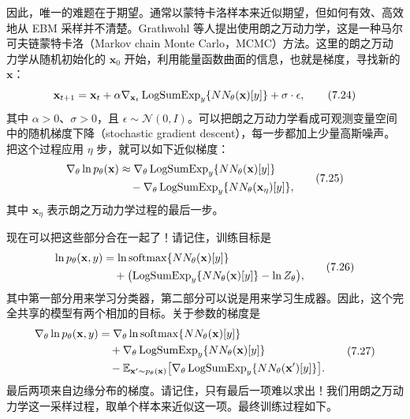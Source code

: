 因此，唯一的难题在于期望。通常以蒙特卡洛样本来近似期望，但如何有效、高效地从 EBM 采样并不清楚。Grathwohl 等人提出使用朗之万动力学，这是一种马尔可夫链蒙特卡洛（Markov chain Monte Carlo，MCMC）方法。这里的朗之万动力学从随机初始化的 $\mathbf{x}_0$ 开始，利用能量函数曲面的信息，也就是梯度，寻找新的 $\mathbf{x}$：
\begin{equation}
\mathbf{x}_{t+1}=\mathbf{x}_t+\alpha\nabla_{\mathbf{x}_t}
  \operatorname{LogSumExp}_y\{NN_\theta(\mathbf{x})[y]\}+\sigma\cdot\epsilon,
\tag{7.24}\label{eq:07-24}
\end{equation}
其中 $\alpha>0$、$\sigma>0$，且 $\epsilon\sim\mathcal{N}(0,I)$。可以把朗之万动力学看成可观测变量空间中的随机梯度下降（stochastic gradient descent），每一步都加上少量高斯噪声。把这个过程应用 $\eta$ 步，就可以如下近似梯度：
\begin{equation}
\begin{aligned}
\nabla_\theta\ln p_\theta(\mathbf{x})
 &\approx\nabla_\theta\operatorname{LogSumExp}_y\{NN_\theta(\mathbf{x})[y]\}\\
 &\quad-\nabla_\theta\operatorname{LogSumExp}_y\{NN_\theta(\mathbf{x}_\eta)[y]\},
\end{aligned}
\tag{7.25}\label{eq:07-25}
\end{equation}
其中 $\mathbf{x}_\eta$ 表示朗之万动力学过程的最后一步。

现在可以把这些部分合在一起了！请记住，训练目标是
\begin{equation}
\begin{aligned}
\ln p_\theta(\mathbf{x},y)
 &=\ln\operatorname{softmax}\{NN_\theta(\mathbf{x})[y]\}\\
 &\quad+\bigl(\operatorname{LogSumExp}_y\{NN_\theta(\mathbf{x})[y]\}-\ln Z_\theta\bigr),
\end{aligned}
\tag{7.26}\label{eq:07-26}
\end{equation}
其中第一部分用来学习分类器，第二部分可以说是用来学习生成器。因此，这个完全共享的模型有两个相加的目标。关于参数的梯度是
\begin{equation}
\begin{aligned}
\nabla_\theta\ln p_\theta(\mathbf{x},y)
 &=\nabla_\theta\ln\operatorname{softmax}\{NN_\theta(\mathbf{x})[y]\}\\
 &\quad+\nabla_\theta\operatorname{LogSumExp}_y\{NN_\theta(\mathbf{x})[y]\}\\
 &\quad-\mathbb E_{\mathbf{x}'\sim p_\theta(\mathbf{x})}
           \bigl[\nabla_\theta\operatorname{LogSumExp}_y\{NN_\theta(\mathbf{x}')[y]\}\bigr].
\end{aligned}
\tag{7.27}\label{eq:07-27}
\end{equation}
最后两项来自边缘分布的梯度。请记住，只有最后一项难以求出！我们用朗之万动力学这一采样过程，取单个样本来近似这一项。最终训练过程如下。

